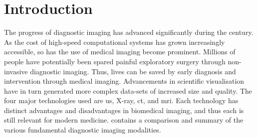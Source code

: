 \chapter{Introduction} \label{cha:introduction} %
The progress of diagnostic imaging has advanced significantly during the  century. As the cost of high-speed computational systems has grown increasingly accessible, so has the use of medical imaging become prominent. Millions of people have potentially been spared painful exploratory surgery through non-invasive diagnostic imaging. Thus, lives can be saved by early diagnosis and intervention through medical imaging. Advancements in scientific visualisation have in turn generated more complex data-sets of increased size and quality. The four major technologies used are \gls{us}, X-ray, \gls{ct}, and \gls{mri}. Each technology has distinct advantages and disadvantages in biomedical imaging, and thus each is still relevant for modern medicine.  contains a comparison and summary of the various fundamental diagnostic imaging modalities.


